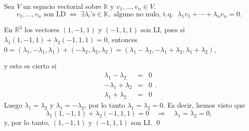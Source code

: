 \documentclass[handout]{beamer} %
\newcommand{\R}{\mathbb R}
\newcommand{\K}{\mathbb K}
\begin{document}
\begin{frame}
    
    \begin{observacion}
        Sea $V$ un espacio vectorial sobre $\K$ y $v_1,\ldots,v_n \in V$. 
        \begin{equation*}
            v_1,\ldots,v_n \text{ son LD} \; \Leftrightarrow\; \exists \lambda_i\text{'s} \in \K, \text{ alguno no nulo, t.q. }\;  \lambda_1v_1+\cdots+\lambda_nv_n=0.
        \end{equation*}
    \end{observacion}

\end{frame}  


\begin{frame}
    
\begin{ejemplo}
En $\R^3$  los vectores $(1,-1,1)$ y $(-1,1,1)$ son LI, pues si $\lambda_1(1,-1,1)+\lambda_2(-1,1,1) =0$,  entonces $0= (\lambda_1,-\lambda_1,\lambda_1)+(-\lambda_2,\lambda_2,\lambda_2) =  (\lambda_1-\lambda_2,-\lambda_1+\lambda_2,\lambda_1+\lambda_2)$, 

y esto es cierto si 
\begin{equation*}
    \begin{array}{rcl}
    \lambda_1-\lambda_2 &=& 0 \\
    -\lambda_1+\lambda_2 &=& 0 \\
    \lambda_1+\lambda_2 &=& 0 
    \end{array}.
\end{equation*} 
Luego $\lambda_1 = \lambda_2$ y $\lambda_1 = -\lambda_2$, por lo tanto $\lambda_1 = \lambda_2 =0$. Es decir,  hemos visto que 
$$
\lambda_1(1,-1,1)+\lambda_2(-1,1,1) =0 \quad \Rightarrow \quad\lambda_1 = \lambda_2 =0,
$$
y, por lo tanto,  $(1,-1,1)$ y $(-1,1,1)$ son LI. \qed
\end{ejemplo}
\end{frame}  
\end{document}
